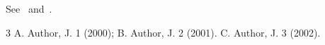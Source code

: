 \documentclass{revtex4-1}
\begin{document}
See~\cite{a,*b} and~\cite{[See][and Chap. 2]c}.
\begin{thebibliography}{3}
 A. Author, J. 1 (2000);
 B. Author, J. 2 (2001).
 C. Author, J. 3 (2002).
\end{thebibliography}
\end{document}
